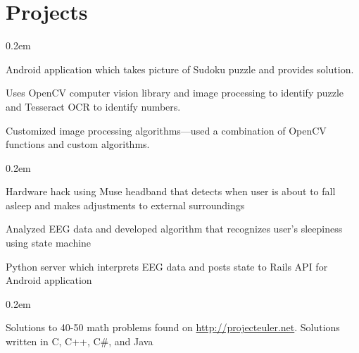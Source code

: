 \documentclass[]{deedy-resume}
\begin{document}
\begin{minipage}[t]{0.66\textwidth}
\sectionsep


\section{Projects}
\begin{tightemize}\itemsep0.2em
\item Android application which takes picture of Sudoku puzzle and provides solution.
\item Uses OpenCV computer vision library and image processing to identify puzzle and Tesseract OCR to
identify numbers.
\item Customized image processing algorithms—used a combination of OpenCV functions and custom
  algorithms.
\end{tightemize}
\sectionsep

\begin{tightemize}\itemsep0.2em
\item Hardware hack using Muse headband that detects when user is about to fall asleep and makes adjustments to external surroundings
\item Analyzed EEG data and developed algorithm that recognizes user's sleepiness using state machine
\item Python server which interprets EEG data and posts state to Rails API for Android application
\end{tightemize}
\sectionsep

\begin{tightemize}\itemsep0.2em
  \item Solutions to 40-50 math problems found on \href{http://projecteuler.net}{http://projecteuler.net}. Solutions written in C, C++, C\#, and
Java
\end{tightemize}
\sectionsep

\end{minipage}
\end{document}
